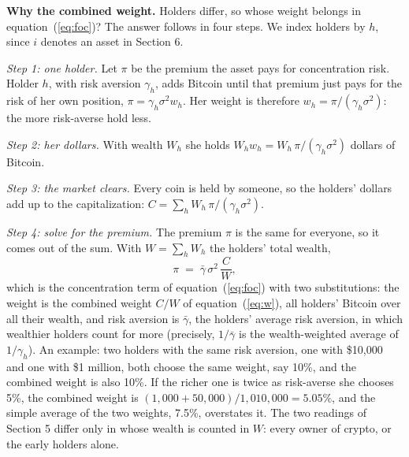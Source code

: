 \documentclass[11pt]{article}
\begin{document}
\textbf{Why the combined weight.} Holders differ, so whose weight belongs in equation~(\ref{eq:foc})? The answer follows in four steps. We index holders by $h$, since $i$ denotes an asset in Section 6.

\emph{Step 1: one holder.} Let $\pi$ be the premium the asset pays for concentration risk. Holder $h$, with risk aversion $\gamma_h$, adds Bitcoin until that premium just pays for the risk of her own position, $\pi = \gamma_h \sigma^2 w_h$. Her weight is therefore $w_h = \pi/(\gamma_h\sigma^2)$: the more risk-averse hold less.

\emph{Step 2: her dollars.} With wealth $W_h$ she holds $W_h w_h = W_h\,\pi/(\gamma_h\sigma^2)$ dollars of Bitcoin.

\emph{Step 3: the market clears.} Every coin is held by someone, so the holders' dollars add up to the capitalization: $C = \sum_h W_h\,\pi/(\gamma_h\sigma^2)$.

\emph{Step 4: solve for the premium.} The premium $\pi$ is the same for everyone, so it comes out of the sum. With $W = \sum_h W_h$ the holders' total wealth,
\begin{equation}
\pi \;=\; \bar{\gamma}\,\sigma^{2}\,\frac{C}{W},
\end{equation}
which is the concentration term of equation~(\ref{eq:foc}) with two substitutions: the weight is the combined weight $C/W$ of equation~(\ref{eq:w}), all holders' Bitcoin over all their wealth, and risk aversion is $\bar{\gamma}$, the holders' average risk aversion, in which wealthier holders count for more (precisely, $1/\bar{\gamma}$ is the wealth-weighted average of $1/\gamma_h$). An example: two holders with the same risk aversion, one with \$10,000 and one with \$1 million, both choose the same weight, say 10\%, and the combined weight is also 10\%. If the richer one is twice as risk-averse she chooses 5\%, the combined weight is $(1{,}000 + 50{,}000)/1{,}010{,}000 = 5.05\%$, and the simple average of the two weights, 7.5\%, overstates it. The two readings of Section 5 differ only in whose wealth is counted in $W$: every owner of crypto, or the early holders alone.
\end{document}
